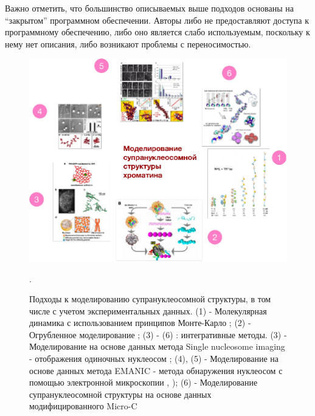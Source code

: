     Важно отметить, что большинство описываемых выше подходов основаны на ``закрытом'' программном обеспечении. Авторы либо не предоставляют доступа к программному обеспечению, либо оно является слабо используемым, поскольку к нему нет описания, либо возникают проблемы с переносимостью.

\begin{figure} [h!]
    \centering
    \includegraphics [width=\textwidth]{images/p1/part1_4_cm/part1_4_cm_f6.pdf}
    \caption[Подходы к моделированию супрануклеосомной структуры]{Подходы к моделированию супрануклеосомной структуры, в том числе с учетом экспериментальных данных. (1) - Молекулярная динамика с использованием принципов Монте-Карло \cite{norouzi_dynamics_2018}; (2) - Огрубленное моделирование \cite{schlick_monte_2009}; (3) - (6) : интегративные методы. (3) - Моделирование на основе данных метода Single nucleosome imaging  - отображения одиночных нуклеосом \cite{maeshima_chromatin_2014}; (4), (5) - Моделирование на основе данных метода EMANIC - метода обнаружения нуклеосом с помощью электронной микроскопии \cite{grigoryev_evidence_2009}, \cite{grigoryev_hierarchical_2016}); (6) - Моделирование супрануклеосомной структуры на основе данных модифицированного Micro-C   \cite{ohno_sub-nucleosomal_2019}}.
    \label{fig:p1_4:f6}
\end{figure}


